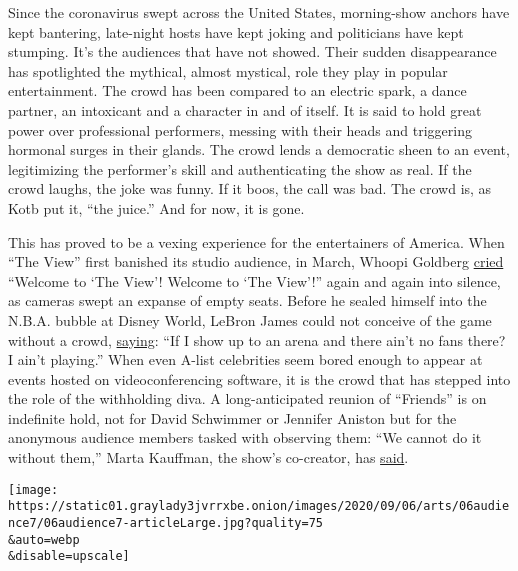 Since the coronavirus swept across the United States, morning-show
anchors have kept bantering, late-night hosts have kept joking and
politicians have kept stumping. It's the audiences that have not showed.
Their sudden disappearance has spotlighted the mythical, almost
mystical, role they play in popular entertainment. The crowd has been
compared to an electric spark, a dance partner, an intoxicant and a
character in and of itself. It is said to hold great power over
professional performers, messing with their heads and triggering
hormonal surges in their glands. The crowd lends a democratic sheen to
an event, legitimizing the performer's skill and authenticating the show
as real. If the crowd laughs, the joke was funny. If it boos, the call
was bad. The crowd is, as Kotb put it, ``the juice.'' And for now, it is
gone.

This has proved to be a vexing experience for the entertainers of
America. When ``The View'' first banished its studio audience, in March,
Whoopi Goldberg
\href{https://www.thecut.com/2020/03/whoopi-goldberg-the-view-no-audience.html}{cried}
``Welcome to `The View'! Welcome to `The View'!'' again and again into
silence, as cameras swept an expanse of empty seats. Before he sealed
himself into the N.B.A. bubble at Disney World, LeBron James could not
conceive of the game without a crowd,
\href{https://twitter.com/bleacherreport/status/1236193321053081600?lang=en}{saying}:
``If I show up to an arena and there ain't no fans there? I ain't
playing.'' When even A-list celebrities seem bored enough to appear at
events hosted on videoconferencing software, it is the crowd that has
stepped into the role of the withholding diva. A long-anticipated
reunion of ``Friends'' is on indefinite hold, not for David Schwimmer or
Jennifer Aniston but for the anonymous audience members tasked with
observing them: ``We cannot do it without them,'' Marta Kauffman, the
show's co-creator, has
\href{https://news.yahoo.com/friends-reunion-special-audience-delay-131824866.html}{said}.

\texttt{[image: https://static01.graylady3jvrrxbe.onion/images/2020/09/06/arts/06audience7/06audience7-articleLarge.jpg?quality=75\\\&auto=webp\\\&disable=upscale]}

